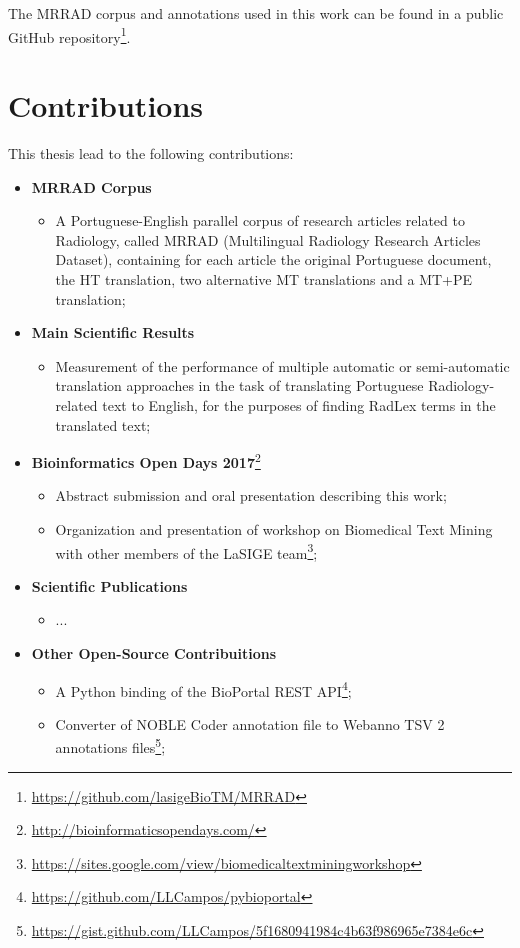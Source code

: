 The MRRAD corpus and annotations used in this work can be found in a public GitHub repository\footnote{\url{https://github.com/lasigeBioTM/MRRAD}}.


\section{Contributions}

This thesis lead to the following contributions: 

\begin{itemize}

\item \textbf{MRRAD Corpus}
	\begin{itemize}
		\item A Portuguese-English parallel corpus of research articles related to Radiology, called MRRAD (Multilingual Radiology Research Articles Dataset), containing for each article the original Portuguese document, the HT translation, two alternative MT translations and a MT+PE translation;
	\end{itemize}
	
\item \textbf{Main Scientific Results}
	\begin{itemize}
		\item Measurement of the performance of multiple automatic or semi-automatic translation approaches in the task of translating Portuguese Radiology-related text to English, for the purposes of finding RadLex terms in the translated text;
	\end{itemize}

\item \textbf{Bioinformatics Open Days 2017}\footnote{\url{http://bioinformaticsopendays.com/}}
	\begin{itemize}
	\item Abstract submission and oral presentation describing this work;
	\item Organization and presentation of workshop on Biomedical Text Mining with other members of the LaSIGE team\footnote{\url{https://sites.google.com/view/biomedicaltextminingworkshop}};
	\end{itemize}
	
\item \textbf{Scientific Publications}
	\begin{itemize}
		\item ...
	\end{itemize}
	
\item \textbf{Other Open-Source Contribuitions}
	\begin{itemize}
		\item A Python binding of the BioPortal REST API\footnote{\url{https://github.com/LLCampos/pybioportal}};
		\item Converter of NOBLE Coder annotation file to Webanno TSV 2 annotations files\footnote{\url{https://gist.github.com/LLCampos/5f1680941984c4b63f986965e7384e6c}};
	\end{itemize}
	

\end{itemize}
